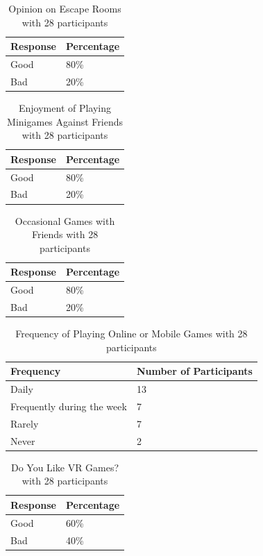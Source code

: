 \documentclass{article}
\begin{document}
\begin{longtable}[]{@{}ll@{}}
\caption{Opinion on Escape Rooms with 28 participants} \label{opinion-on-escape-rooms} \\
\toprule\noalign{}
Response & Percentage \\
\midrule\noalign{}
\endhead
\bottomrule\noalign{}
\endlastfoot
Good & 80\% \\
Bad & 20\% \\
\end{longtable}

\begin{longtable}[]{@{}ll@{}}
\caption{Enjoyment of Playing Minigames Against Friends with 28 participants} \label{enjoyment-of-playing-minigames-against-friends} \\
\toprule\noalign{}
Response & Percentage \\
\midrule\noalign{}
\endhead
\bottomrule\noalign{}
\endlastfoot
Good & 80\% \\
Bad & 20\% \\
\end{longtable}

\begin{longtable}[]{@{}ll@{}}
\caption{Occasional Games with Friends with 28 participants} \label{occasional-games-with-friends} \\
\toprule\noalign{}
Response & Percentage \\
\midrule\noalign{}
\endhead
\bottomrule\noalign{}
\endlastfoot
Good & 80\% \\
Bad & 20\% \\
\end{longtable}

\begin{longtable}[]{@{}ll@{}}
\caption{Frequency of Playing Online or Mobile Games with 28 participants} \label{frequency-of-playing-online-or-mobile-games} \\
\toprule\noalign{}
Frequency & Number of Participants \\
\midrule\noalign{}
\endhead
\bottomrule\noalign{}
\endlastfoot
Daily & 13 \\
Frequently during the week & 7 \\
Rarely & 7 \\
Never & 2 \\
\end{longtable}

\begin{longtable}[]{@{}ll@{}}
\caption{Do You Like VR Games? with 28 participants} \label{do-you-like-vr-games} \\
\toprule\noalign{}
Response & Percentage \\
\midrule\noalign{}
\endhead
\bottomrule\noalign{}
\endlastfoot
Good & 60\% \\
Bad & 40\% \\
\end{longtable}
\end{document}
